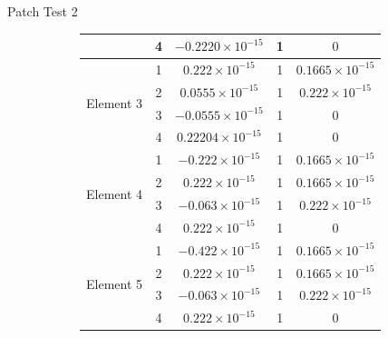 \documentclass{beamer}
\begin{document}
\begin{frame}[t,fragile]{Patch Test 2}
\begin{figure}
\begin{subfigure}{0.45\textwidth}
{\begin{tabular}{|c|c|c|c|c|}
& 4 & $-0.2220\times 10^{-15}$ &1& $0$\\
\hline
\multirow{4}{5em}{Element 3} & 1 & $0.222\times 10^{-15}$ &1& $0.1665\times 10^{-15}$\\
& 2 & $0.0555\times 10^{-15}$ &1& $0.222\times 10^{-15}$\\
& 3 & $-0.0555\times 10^{-15}$ &1& $0$\\
& 4 & $0.22204\times 10^{-15}$ &1& $0$\\
\hline
\multirow{4}{5em}{Element 4} & 1 & $-0.222\times 10^{-15}$ &1& $0.1665\times 10^{-15}$\\
& 2 & $0.222\times 10^{-15}$ &1& $0.1665\times 10^{-15}$\\
& 3 & $-0.063\times 10^{-15}$ &1& $0.222\times 10^{-15}$\\
& 4 & $0.222\times 10^{-15}$ &1& $0$\\
\hline
\multirow{4}{5em}{Element 5} & 1 & $-0.422\times 10^{-15}$ &1& $0.1665\times 10^{-15}$\\
& 2 & $0.222\times 10^{-15}$ &1& $0.1665\times 10^{-15}$\\
& 3 & $-0.063\times 10^{-15}$ &1& $0.222\times 10^{-15}$\\
& 4 & $0.222\times 10^{-15}$ &1& $0$\\
\hline
\end{tabular}}
     \end{subfigure}
  \end{figure}
\end{frame}
\end{document}
